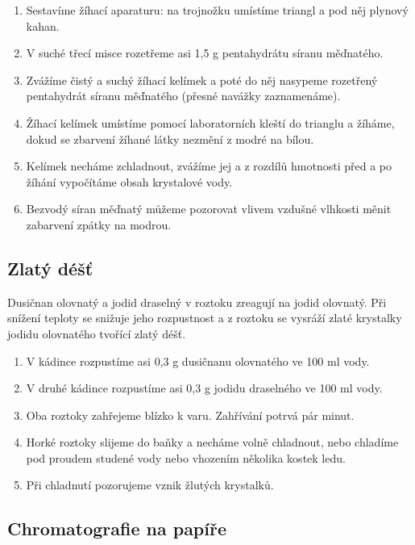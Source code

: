 \begin{enumerate}
  \item Sestavíme žíhací aparaturu: na trojnožku umístíme triangl a pod něj plynový kahan.
  \item V suché třecí misce rozetřeme asi 1,5 g pentahydrátu síranu měďnatého.
  \item Zvážíme čistý a suchý žíhací kelímek a poté do něj nasypeme rozetřený pentahydrát síranu měďnatého (přesné navážky zaznamenáme).
  \item Žíhací kelímek umístíme pomocí laboratorních kleští do trianglu a žíháme, dokud se zbarvení žíhané látky nezmění z modré na bílou.
  \item Kelímek necháme zchladnout, zvážíme jej a z rozdílů hmotnosti před a po žíhání vypočítáme obsah krystalové vody.
  \item Bezvodý síran měďnatý můžeme pozorovat vlivem vzdušné vlhkosti měnit zabarvení zpátky na modrou.
\end{enumerate}

\subsection{Zlatý déšť}



Dusičnan olovnatý a jodid draselný v roztoku zreagují na jodid olovnatý. Při snížení teploty se snižuje jeho rozpustnost a z roztoku se vysráží zlaté krystalky jodidu olovnatého tvořící zlatý déšť.


\begin{enumerate}
  \item V kádince rozpustíme asi 0,3 g dusičnanu olovnatého ve 100 ml vody.
  \item V druhé kádince rozpustíme asi 0,3 g jodidu draselného ve 100 ml vody.
  \item Oba roztoky zahřejeme blízko k varu. Zahřívání potrvá pár minut.
  \item Horké roztoky slijeme do baňky a necháme volně chladnout, nebo chladíme pod proudem studené vody nebo vhozením několika kostek ledu.
  \item Při chladnutí pozorujeme vznik žlutých krystalků.
\end{enumerate}

\subsection{Chromatografie na papíře}

